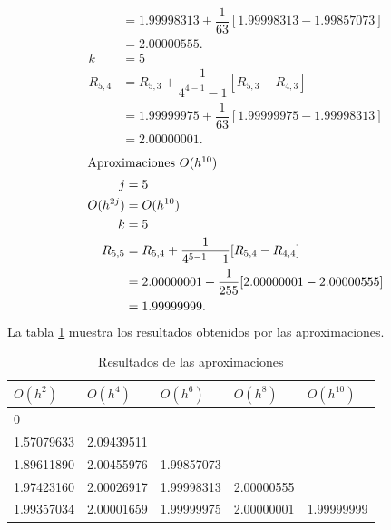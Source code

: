\begin{exerciseT}
\begin{align*}
			&= 1.99998313 + \dfrac{1}{63}[1.99998313-1.99857073]\\
			&= 2.00000555.\\
		k &= 5\\
		R_{5,4} &= R_{5,3} + \dfrac{1}{4^{4-1}-1}[R_{5,3}-R_{4,3}]\\
			&= 1.99999975 + \dfrac{1}{63}[1.99999975-1.99998313]\\
			&= 2.00000001.
	\end{align*}
	\begin{align*}
		\intertext{Aproximaciones $O(h^{10})$}
		j &= 5\\
		O(h^{2j}) &= O(h^{10})\\
		k &= 5\\
		R_{5,5} &= R_{5,4} + \dfrac{1}{4^{5-1}-1}[R_{5,4}-R_{4,4}]\\
			&= 2.00000001 + \dfrac{1}{255}[2.00000001-2.00000555]\\
			&= 1.99999999.
	\end{align*}
	La tabla \ref{table:exIntRomberg1} muestra los resultados obtenidos por las aproximaciones.
	\begin{table}[H]
		\centering
		\begin{tabular}{lllll}
			\toprule
			$O(h^2)$ & $O(h^4)$ & $O(h^6)$ & $O(h^8)$ & $O(h^{10})$\\
			\midrule
			0	& & & &\\
			1.57079633 & 2.09439511 & & & \\
			1.89611890 & 2.00455976 & 1.99857073 & & \\
			1.97423160 & 2.00026917 & 1.99998313 & 2.00000555 & \\
			1.99357034 & 2.00001659 & 1.99999975 & 2.00000001 & 1.99999999 \\
			\bottomrule
		\end{tabular}
		\caption{Resultados de las aproximaciones}
		\label{table:exIntRomberg1}
	\end{table}
\end{exerciseT}




